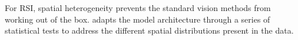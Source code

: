 For RSI, spatial heterogeneity prevents the standard vision methods from working out of the box. 
\cite{Xie2021} adapts the model architecture through a series of statistical tests to address the different spatial distributions present in the data.





        
        
        
